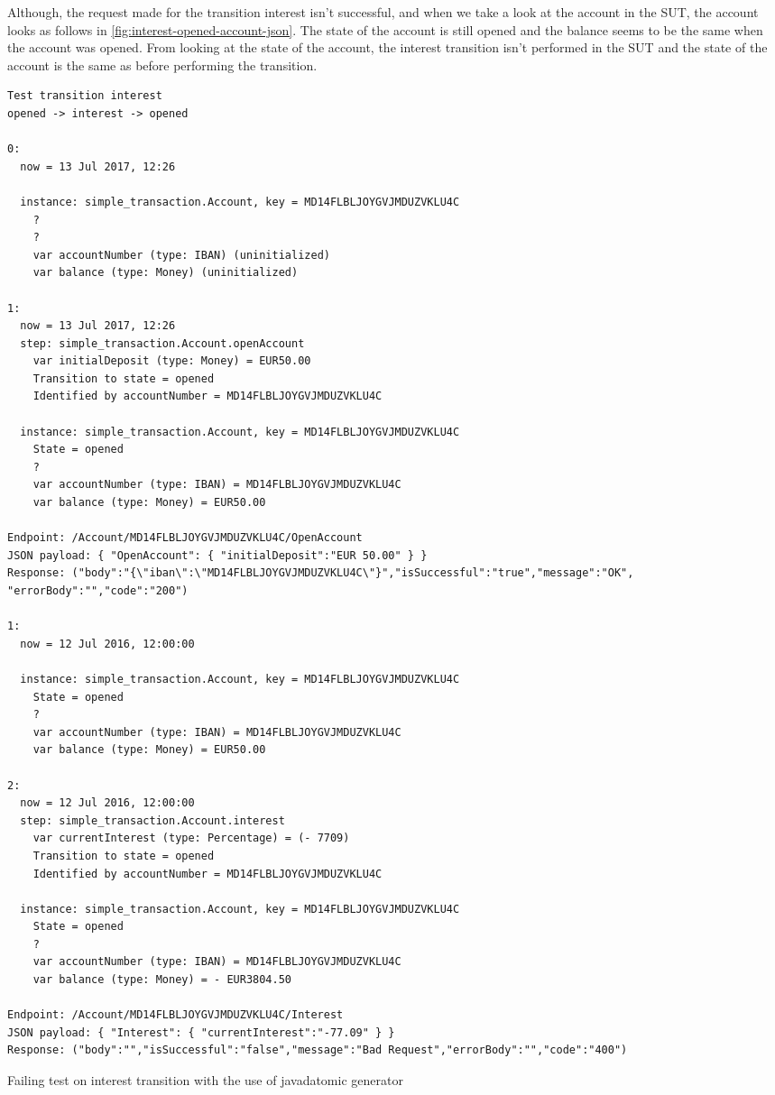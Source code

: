 Although, the request made for the transition interest isn't
successful, and when we take a look at the account in the SUT, the account looks
as follows in \autoref{fig:interest-opened-account-json}. The state of the
account is still opened and the balance seems to be the same when the account
was opened. From looking at the state of the account, the interest transition
isn't performed in the SUT and the state of the account is the same as before
performing the transition.


\begin{sourcecode}[h!]
\begin{lstlisting}[]
Test transition interest
opened -> interest -> opened

0:
  now = 13 Jul 2017, 12:26

  instance: simple_transaction.Account, key = MD14FLBLJOYGVJMDUZVKLU4C
    ?
    ?
    var accountNumber (type: IBAN) (uninitialized)
    var balance (type: Money) (uninitialized)

1:
  now = 13 Jul 2017, 12:26
  step: simple_transaction.Account.openAccount
    var initialDeposit (type: Money) = EUR50.00
    Transition to state = opened
    Identified by accountNumber = MD14FLBLJOYGVJMDUZVKLU4C

  instance: simple_transaction.Account, key = MD14FLBLJOYGVJMDUZVKLU4C
    State = opened
    ?
    var accountNumber (type: IBAN) = MD14FLBLJOYGVJMDUZVKLU4C
    var balance (type: Money) = EUR50.00

Endpoint: /Account/MD14FLBLJOYGVJMDUZVKLU4C/OpenAccount
JSON payload: { "OpenAccount": { "initialDeposit":"EUR 50.00" } }
Response: ("body":"{\"iban\":\"MD14FLBLJOYGVJMDUZVKLU4C\"}","isSuccessful":"true","message":"OK",
"errorBody":"","code":"200")

1:
  now = 12 Jul 2016, 12:00:00

  instance: simple_transaction.Account, key = MD14FLBLJOYGVJMDUZVKLU4C
    State = opened
    ?
    var accountNumber (type: IBAN) = MD14FLBLJOYGVJMDUZVKLU4C
    var balance (type: Money) = EUR50.00

2:
  now = 12 Jul 2016, 12:00:00
  step: simple_transaction.Account.interest
    var currentInterest (type: Percentage) = (- 7709)
    Transition to state = opened
    Identified by accountNumber = MD14FLBLJOYGVJMDUZVKLU4C

  instance: simple_transaction.Account, key = MD14FLBLJOYGVJMDUZVKLU4C
    State = opened
    ?
    var accountNumber (type: IBAN) = MD14FLBLJOYGVJMDUZVKLU4C
    var balance (type: Money) = - EUR3804.50

Endpoint: /Account/MD14FLBLJOYGVJMDUZVKLU4C/Interest
JSON payload: { "Interest": { "currentInterest":"-77.09" } }
Response: ("body":"","isSuccessful":"false","message":"Bad Request","errorBody":"","code":"400")
\end{lstlisting}
\caption{Failing test on interest transition with the use of javadatomic generator}
\label{fig:result-javadatomic-interest}
\end{sourcecode}

